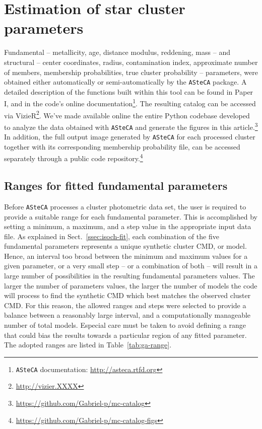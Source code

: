\documentclass{aa}
\begin{document}

\section{Estimation of star cluster parameters}
\label{sec:fund-params}

Fundamental -- metallicity, age, distance modulus, reddening, mass -- and
structural -- center coordinates, radius, contamination index, approximate
number of members, membership probabilities, true cluster probability --
parameters, were obtained either automatically or semi-automatically by the
\texttt{ASteCA} package.
%
A detailed description of the functions built within this tool can be found in
Paper I, and in the code's online documentation\footnote{\texttt{ASteCA}
documentation: \url{http://asteca.rtfd.org}}.
%
The resulting catalog can be accessed via
VizieR\footnote{\url{http://vizier.XXXX}}.
We've made available online the entire Python codebase developed to analyze
the data obtained with \texttt{ASteCA} and generate the figures in this
article.\footnote{\url{https://github.com/Gabriel-p/mc-catalog}}
%
In addition, the full output image generated by \texttt{ASteCA} for each
processed cluster together with its corresponding membership probability file,
can be accessed separately through a public code
repository.\footnote{\url{https://github.com/Gabriel-p/mc-catalog-figs}}



\subsection{Ranges for fitted fundamental parameters}
\label{ssec:param-ranges}

Before \texttt{ASteCA} processes a cluster photometric data set, the user is
required to provide a suitable range for each fundamental parameter. This is
accomplished by setting a minimum, a maximum, and a step value in the
appropriate input data file.
%
As explained in Sect.~\ref{ssec:isoch-fit}, each combination of the five
fundamental parameters represents a unique synthetic cluster CMD, or model.
%
Hence, an interval too broad between the minimum and maximum
values for a given parameter, or a very small step -- or a combination of
both -- will result in a large number of possibilities in the resulting
fundamental parameters values.
%
The larger the number of parameters values, the larger the number of models the
code will process to find the synthetic CMD which best matches the observed
cluster CMD.\@
%
For this reason, the allowed ranges and steps were selected to provide
a balance between a reasonably large interval, and a computationally manageable
number of total models.
Especial care must be taken to avoid defining a range that could bias the
results towards a particular region of any fitted parameter.
The adopted ranges are listed in Table~\ref{tab:ga-range}.\\
\end{document}
